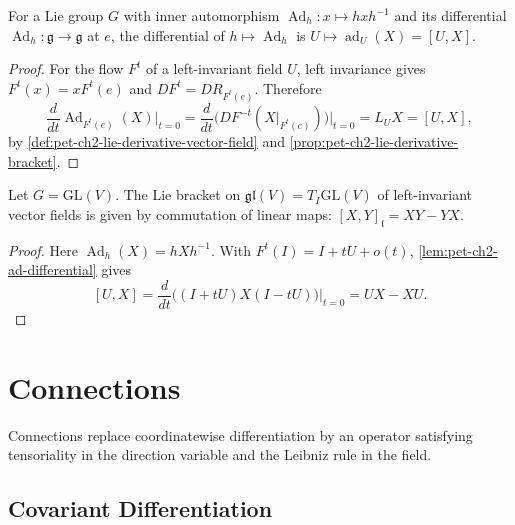 \begin{lemma}
  \label{lem:pet-ch2-ad-differential}
  \leanok
  For a Lie group $G$ with inner automorphism $\operatorname{Ad}_h:x\mapsto hxh^{-1}$
  and its differential $\operatorname{Ad}_h:\mathfrak g\to\mathfrak g$ at $e$, the
  differential of $h\mapsto\operatorname{Ad}_h$ is $U\mapsto\operatorname{ad}_U(X)=[U,X]$.
\end{lemma}
\begin{proof}
  \leanok
  \sketch
  For the flow $F^t$ of a left-invariant
  field $U$, left invariance gives $F^t(x)=xF^t(e)$ and
  $DF^t=DR_{F^t(e)}$. Therefore
  \[
    \frac d{dt}\operatorname{Ad}_{F^t(e)}(X)\Big|_{t=0}
      =\frac d{dt}\big(DF^{-t}(X|_{F^t(e)})\big)\Big|_{t=0}
      =L_UX=[U,X],
  \]
  by \cref{def:pet-ch2-lie-derivative-vector-field} and
  \cref{prop:pet-ch2-lie-derivative-bracket}.
\end{proof}

\begin{lemma}
  \label{lem:pet-ch2-gl-bracket-commutator}
  \leanok
  Let $G=\mathrm{GL}(V)$. The Lie bracket on $\mathfrak{gl}(V)=T_I\mathrm{GL}(V)$
  of left-invariant vector fields is given by commutation of linear maps:
  $[X,Y]_{\mathfrak l}=XY-YX$.
\end{lemma}
\begin{proof}
  \leanok
  \sketch
  Here
  $\operatorname{Ad}_h(X)=hXh^{-1}$. With
  $F^t(I)=I+tU+o(t)$, \cref{lem:pet-ch2-ad-differential} gives
  \[
    [U,X]
      =\frac d{dt}\big((I+tU)X(I-tU)\big)\Big|_{t=0}
      =UX-XU.
  \]
\end{proof}

\section{Connections}

Connections replace coordinatewise differentiation by an operator satisfying
tensoriality in the direction variable and the Leibniz rule in the field.

\subsection{Covariant Differentiation}

